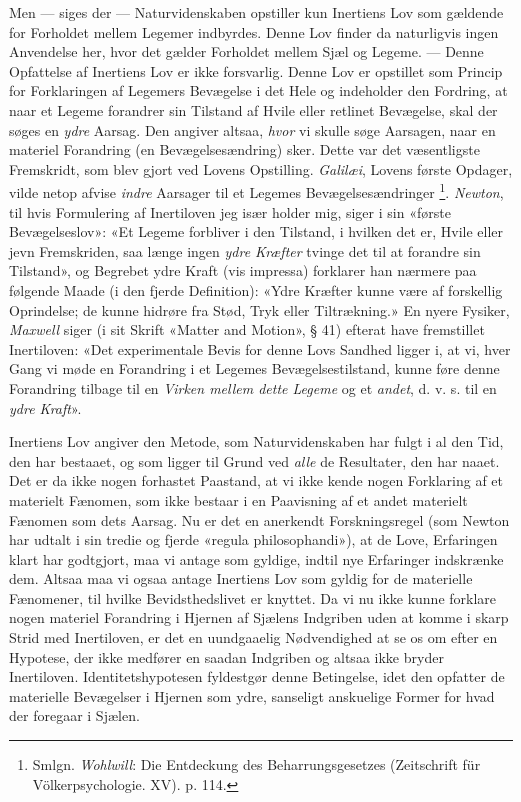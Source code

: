 \documentclass[12pt,a4paper,openany]{book}
\newcommand{\opage}[1]{\marginnote{\footnotesize\textit{[#1]}}}
\begin{document}
Men --- siges der --- Naturvidenskaben opstiller kun Inertiens Lov som gældende
for Forholdet mellem Legemer indbyrdes. Denne Lov finder da naturligvis ingen
Anvendelse her, hvor det gælder Forholdet mellem Sjæl og Legeme. --- Denne
Opfattelse af Inertiens Lov er ikke forsvarlig. Denne Lov er opstillet som
Princip for Forklaringen af Legemers Bevægelse i det Hele og indeholder den
Fordring, at naar et Legeme forandrer sin Tilstand af Hvile eller retlinet
Bevægelse, skal der søges en \emph{ydre} Aarsag. Den angiver altsaa,
\emph{hvor} vi skulle søge Aarsagen, naar en materiel Forandring (en
Bevægelsesændring) sker. Dette var det væsentligste Fremskridt, som blev gjort
ved Lovens Opstilling. \emph{Galilæi}, Lovens første Opdager, vilde netop
afvise \emph{indre} Aarsager til et Legemes Bevægelsesændringer%
\footnote[1]{Smlgn. \emph{Wohlwill}: Die Entdeckung des Beharrungsgesetzes
(Zeitschrift für Völkerpsychologie. XV). p. 114.}. \emph{Newton}, til hvis
Formulering af Inertiloven jeg især holder mig, siger i sin «første
Bevægelseslov»: «Et Legeme forbliver i den Tilstand, i hvilken det er, Hvile
eller jevn Fremskriden, saa længe ingen \emph{ydre Kræfter} tvinge det til at
forandre sin
\setcounter{footnote}{0}%
\opage{83}Tilstand», og Begrebet ydre Kraft (vis impressa) forklarer han
nærmere paa følgende Maade (i den fjerde Definition): «Ydre Kræfter kunne være
af forskellig Oprindelse; de kunne hidrøre fra Stød, Tryk eller Tiltrækning.»
En nyere Fysiker, \emph{Maxwell} siger (i sit Skrift «Matter and Motion», § 41)
efterat have fremstillet Inertiloven: «Det experimentale Bevis for denne Lovs
Sandhed ligger i, at vi, hver Gang vi møde en Forandring i et Legemes
Bevægelsestilstand, kunne føre denne Forandring tilbage til en \emph{Virken
mellem dette Legeme} og et \emph{andet}, d. v. s. til en \emph{ydre Kraft}».

Inertiens Lov angiver den Metode, som Naturvidenskaben har fulgt i al den Tid,
den har bestaaet, og som ligger til Grund ved \emph{alle} de Resultater, den
har naaet. Det er da ikke nogen forhastet Paastand, at vi ikke kende nogen
Forklaring af et materielt Fænomen, som ikke bestaar i en Paavisning af et
andet materielt Fænomen som dets Aarsag. Nu er det en anerkendt Forskningsregel
(som Newton har udtalt i sin tredie og fjerde «regula philosophandi»), at de
Love, Erfaringen klart har godtgjort, maa vi antage som gyldige, indtil nye
Erfaringer indskrænke dem. Altsaa maa vi ogsaa antage Inertiens Lov som gyldig
for de materielle Fænomener, til hvilke Bevidsthedslivet er knyttet. Da vi nu
ikke kunne forklare nogen materiel Forandring i Hjernen af Sjælens Indgriben
uden at komme i skarp Strid med Inertiloven, er det en uundgaaelig Nødvendighed
at se os om efter en Hypotese, der ikke medfører en saadan Indgriben og altsaa
ikke bryder Inertiloven. Identitetshypotesen fyldestgør denne Betingelse, idet
den opfatter de materielle Bevægelser i Hjernen som ydre, sanseligt anskuelige
Former for hvad der foregaar i Sjælen.
\end{document}
